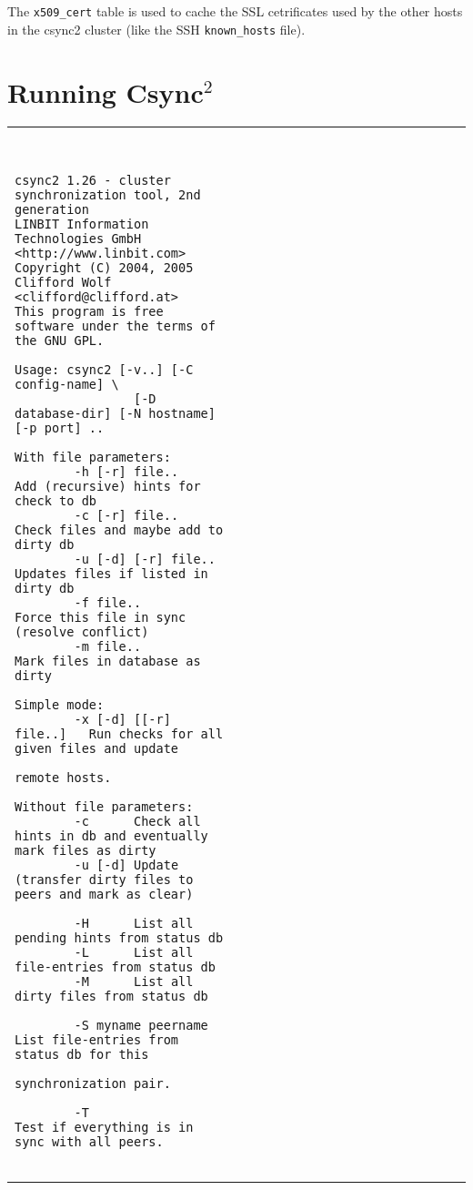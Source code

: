 \documentclass[a4paper,twocolumn]{article}
\def\csync2{{\sc Csync$^{2}$}}
\begin{document}
The {\tt x509\_cert} table is used to cache the SSL cetrificates used by the
other hosts in the csync2 cluster (like the SSH {\tt known\_hosts} file).

\section{Running \csync2}


\begin{figure*}[t]
  \begin{center}
    \begin{tabular}{|p{0.5\linewidth}|p{0.5\linewidth}|}
      \hline
\begin{tiny}
\begin{verbatim}


csync2 1.26 - cluster synchronization tool, 2nd generation
LINBIT Information Technologies GmbH <http://www.linbit.com>
Copyright (C) 2004, 2005  Clifford Wolf <clifford@clifford.at>
This program is free software under the terms of the GNU GPL.

Usage: csync2 [-v..] [-C config-name] \
                [-D database-dir] [-N hostname] [-p port] ..

With file parameters:
        -h [-r] file..          Add (recursive) hints for check to db
        -c [-r] file..          Check files and maybe add to dirty db
        -u [-d] [-r] file..     Updates files if listed in dirty db
        -f file..               Force this file in sync (resolve conflict)
        -m file..               Mark files in database as dirty

Simple mode:
        -x [-d] [[-r] file..]   Run checks for all given files and update
                                remote hosts.

Without file parameters:
        -c      Check all hints in db and eventually mark files as dirty
        -u [-d] Update (transfer dirty files to peers and mark as clear)

        -H      List all pending hints from status db
        -L      List all file-entries from status db
        -M      List all dirty files from status db

        -S myname peername      List file-entries from status db for this
                                synchronization pair.

        -T                      Test if everything is in sync with all peers.


\end{verbatim}
\end{tiny}
\end{tabular}
\end{center}
\end{figure*}
\end{document}
